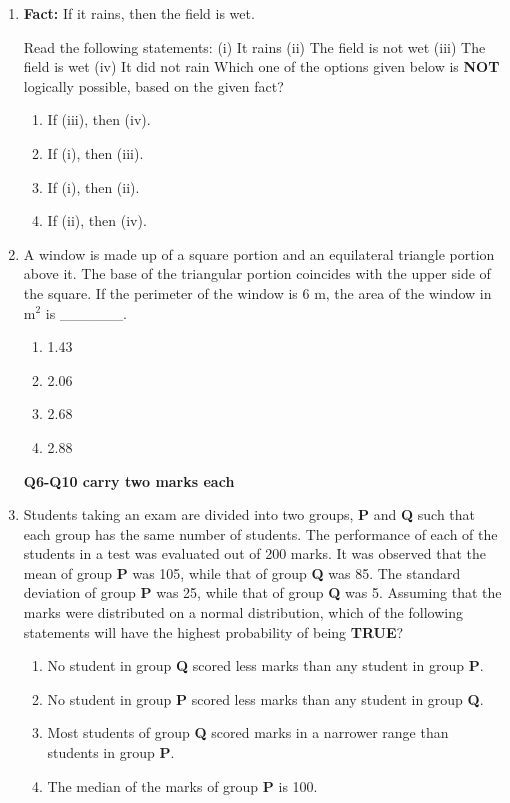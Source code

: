 \documentclass[journal,12pt,onecolumn]{IEEEtran}
\theoremstyle{remark}
\begin{document}
\begin{enumerate}
\item \textbf{Fact:} If it rains, then the field is wet.

Read the following statements: 
(i) It rains
(ii) The field is not wet
(iii) The field is wet
(iv) It did not rain
Which one of the options given below is \textbf{NOT} logically possible, based on the given fact?
\begin{multicols}{2}
\begin{enumerate}
    \item If (iii), then (iv).
    \item If (i), then (iii).
    \item If (i), then (ii).
    \item If (ii), then (iv).
\end{enumerate}
\end{multicols}

\item A window is made up of a square portion and an equilateral triangle portion above it. The base of the triangular portion coincides with the upper side of the square. If the perimeter of the window is 6 m, the area of the window in m$^2$ is \_\_\_\_\_\_.
\begin{multicols}{4}
\begin{enumerate}
    \item 1.43
    \item 2.06
    \item 2.68
    \item 2.88
\end{enumerate}

\end{multicols}
\textbf{Q6-Q10 carry two marks each}
\item Students taking an exam are divided into two groups, \textbf{ P } and \textbf{ Q } such that each group has the same number of students. The performance of each of the students in a test was evaluated out of 200 marks. It was observed that the mean of group \textbf{P} was 105, while that of group \textbf{Q} was 85. The standard deviation of group \textbf{P} was 25, while that of group \textbf{Q} was 5. Assuming that the marks were distributed on a normal distribution, which of the following statements will have the highest probability of being \textbf{TRUE}?


\begin{enumerate}
    \item No student in group \textbf{Q} scored less marks than any student in group \textbf{P}.
    \item No student in group \textbf{P} scored less marks than any student in group \textbf{Q}.
    \item Most students of group \textbf{Q} scored marks in a narrower range than students in group \textbf{P}.
    \item The median of the marks of group \textbf{P} is 100.
\end{enumerate}



\end{enumerate}
\end{document}
